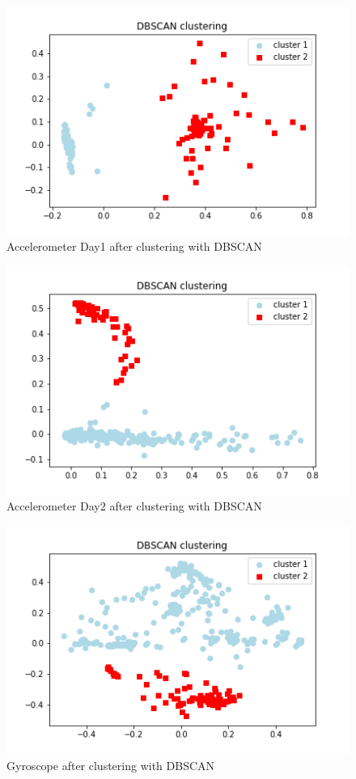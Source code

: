\documentclass[idxtotoc,hyperref,openany]{labbook} %
\begin{document}
\begin{figure}[h]
\includegraphics[width=0.9\linewidth]{DBSCAN_Plot_Accelerometer_Day1.png}
\setlength\belowcaptionskip{-10pt}
\caption{Accelerometer Day1 after clustering with DBSCAN}
\label{DBSCAN AccelerometerDay1}
\end{figure}

\begin{figure}[h]
\includegraphics[width=0.9\linewidth]{DBSCAN_Plot_Accelerometer_Day2.png}
\setlength\belowcaptionskip{-10pt}
\caption{Accelerometer Day2 after clustering with DBSCAN}
\label{DBSCAN AccelerometerDay2}
\end{figure}

\begin{figure}[h]
\includegraphics[width=0.9\linewidth]{DBSCAN_Plot_Gyroscope.png}
\setlength\belowcaptionskip{-10pt}
\caption{Gyroscope after clustering with DBSCAN}
\label{DBSCAN Gyroscope}
\end{figure}
\end{document}
